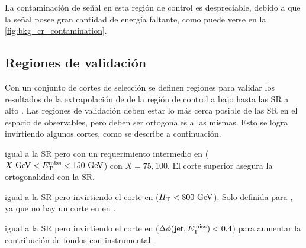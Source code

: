 
La contaminación de señal en esta región de control es despreciable, debido a
que la señal posee gran cantidad de energía faltante, como puede verse en la
\cref{fig:bkg_cr_contamination}.







\subsection{Regiones de validación}\label{sec:bkg_vrs2}

Con un conjunto de cortes de selección se definen regiones para validar los resultados de la
extrapolación de {\gjet} de la región de control a bajo {\met} hasta
las SR a alto {\met}. Las regiones de validación deben estar lo más cerca posible
de las SR en el espacio de observables, pero deben ser ortogonales a las mismas.
Esto se logra invirtiendo algunos cortes, como se describe a continuación.

\begin{description}\itemsep0.1cm
\item[{\bf VRMX}] igual a la SR pero con un requerimiento intermedio en {\met}
  ($X\gev < \met < 150\gev$) con $X = 75,100$. El corte superior asegura la
  ortogonalidad con la SR.
\item[{\bf VRH}] igual a la SR pero invirtiendo el corte en {\HT} ($\HT<
  800\gev$). Solo definida para {\SRH}, ya que no hay un corte en {\HT} en
  {\SRL}.
\item[{\bf VRQ}] igual a la SR pero invirtiendo el corte en {\dphijm} ($\Delta \phi (\mathrm{jet},E_{\mathrm{T}}^{\mathrm{miss}}) < 0.4$)
  para aumentar la contribución de fondos con {\met}
  instrumental.
\end{description}

